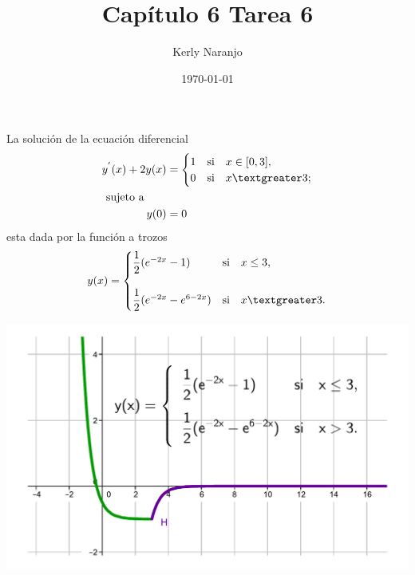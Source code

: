 \documentclass[a4paper, 12pt]{article}
\author{Kerly Naranjo}
\title{Capítulo 6 Tarea 6}
\date{\today}
\begin{document}
	\maketitle
	La solución de la ecuación diferencial
	\begin{align*}
	  y^{'}(x)+2y(x)&= 
	  \begin{cases}
	1&  \text{si} \quad x \in [0,3], \\
	0& \text{si} \quad x \textgreater 3 ; \\	 	
	\end{cases}
	\\ 
	\text{sujeto a}\quad \quad &\\
	 y(0)&=0\\
	\end{align*}
	esta dada por la función a trozos 
	\[
	 y(x) = \begin{cases}
	\dfrac{1}{2}(e^{-2x}-1)&  \text{si} \quad x \leq 3,
	\\
	\\    
    \dfrac{1}{2}(e^{-2x}-e^{6-2x})& \text{si}\quad x   \textgreater 3.
	 \\	 	
	\end{cases}
     \]
\begin{center}
\includegraphics[scale=0.5]{figure1.pdf}
\end{center}
\end{document}
